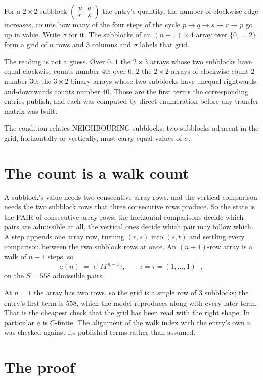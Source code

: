\documentclass[11pt,a4paper]{article}
\theoremstyle{plain}
\theoremstyle{definition}
\begin{document}
For a $2\times2$ subblock $\begin{pmatrix}p&q\\r&s\end{pmatrix}$ the
entry's quantity, the number of clockwise edge increases, counts how many of the four steps of the cycle $p\to q\to s\to r\to p$ go up in value. Write $\sigma$ for it. The subblocks of an
$(n+1)\times4$ array over $\{0,\dots,2\}$ form a grid of $n$ rows and $3$
columns and $\sigma$ labels that grid.

The reading is not a guess. Over $0..1$ the $2\times3$ arrays whose two subblocks have equal
clockwise counts number $40$; over $0..2$ the $2\times2$ arrays of clockwise count $2$ number
$30$; the $3\times2$ binary arrays whose two subblocks have unequal rightwards-and-downwards
counts number $40$. Those are the first terms the corresponding entries publish, and each was
computed by direct enumeration before any transfer matrix was built.

The condition relates NEIGHBOURING subblocks: two subblocks adjacent in the grid, horizontally
or vertically, must carry equal values of $\sigma$.

\section{The count is a walk count}

A subblock's value needs two consecutive array rows, and the vertical
comparison needs the two subblock rows that three consecutive rows produce. So the state is the
PAIR of consecutive array rows: the horizontal comparisons decide which pairs are admissible at
all, the vertical ones decide which pair may follow which. A step appends one array row,
turning $(r,s)$ into $(s,t)$ and settling every comparison between the two subblock rows at
once. An $(n+1)$-row array is a walk of $n-1$ steps, so
\[
a(n)\;=\;\iota^{\!\top}M^{\,n-1}\tau,\qquad\iota=\tau=(1,\dots,1)^{\!\top},
\]
on the $S=558$ admissible pairs.

At $n=1$ the array has two rows, so the grid is a single row of $3$
subblocks; the entry's first term is $558$, which the model
reproduces along with every later term. That is the cheapest check that the grid has been read
with the right shape.
In particular $a$ is $C$-finite. The alignment of the walk index with the entry's own $n$ was
checked against its published terms rather than assumed.

\section{The proof}
\end{document}
